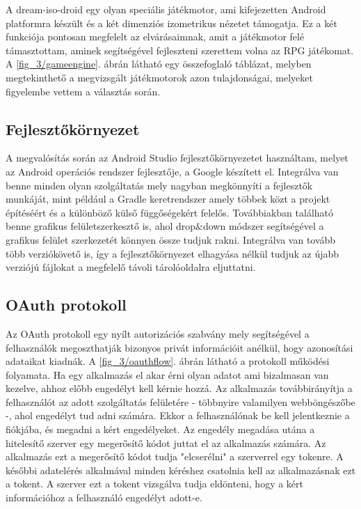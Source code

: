 
A dream-iso-droid egy olyan speciális játékmotor, ami kifejezetten Android platformra készült és a két dimenziós izometrikus nézetet támogatja. 
Ez a két funkciója pontosan megfelelt az elvárásaimnak, amit a játékmotor felé támasztottam, aminek segítségével fejleszteni szerettem volna az RPG játékomat.
A \ref{fig_3/gameengine}. ábrán látható egy összefoglaló táblázat, melyben megtekinthető a megvizsgált játékmotorok azon tulajdonságai, melyeket figyelembe vettem a választás során. 

\subsection{Fejlesztőkörnyezet}
\label{ide}

A megvalósítás során az Android Studio fejlesztőkörnyezetet használtam, melyet az Android operációs rendszer fejlesztője, a Google készített el. 
Integrálva van benne minden olyan szolgáltatás mely nagyban megkönnyíti a fejlesztők munkáját, mint például a Gradle keretrendszer amely többek közt a projekt építéséért és a különböző külső függőségekért felelős. 
Továbbiakban található benne grafikus felületszerkesztő is, ahol drop\&down módszer segítségével a grafikus felület szerkezetét könnyen össze tudjuk rakni. 
Integrálva van tovább több verziókövető is, így a fejlesztőkörnyezet elhagyása nélkül tudjuk az újabb verziójú fájlokat a megfelelő távoli tárolóoldalra eljuttatni. 

\subsection{OAuth protokoll}
\label{oauth}


Az OAuth protokoll \cite{oauthprotocol} egy nyílt autorizációs szabvány mely segítségével a felhasználók megoszthatják bizonyos privát információit anélkül, hogy azonosítási adataikat kiadnák. 
A \ref{fig_3/oauthflow}. ábrán látható a protokoll működési folyamata. 
Ha egy alkalmazás el akar érni olyan adatot ami bizalmasan van kezelve, ahhoz előbb engedélyt kell kérnie hozzá. 
Az alkalmazás továbbirányítja a felhasználót az adott szolgáltatás felületére - többnyire valamilyen webböngészőbe -, ahol engedélyt tud adni számára. 
Ekkor a felhasználónak be kell jelentkeznie a fiókjába, és megadni a kért engedélyeket. 
Az engedély megadása utána a hitelesítő szerver egy megerősítő kódot juttat el az alkalmazás számára. 
Az alkalmazás ezt a megerősítő kódot tudja "elcserélni" a szerverrel egy tokenre. 
A későbbi adatelérés alkalmával minden kéréshez csatolnia kell az alkalmazásnak ezt a tokent. 
A szerver ezt a tokent vizsgálva tudja eldönteni, hogy a kért információhoz a felhasználó engedélyt adott-e. 

